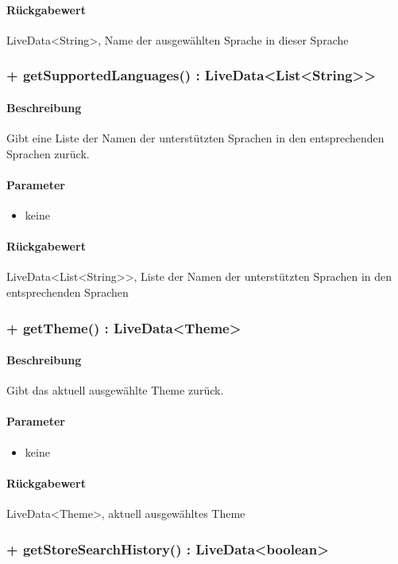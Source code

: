 \paragraph*{Rückgabewert}
LiveData<String>, Name der ausgewählten Sprache in dieser Sprache

\subsubsection{+ getSupportedLanguages() : LiveData<List<String>>}%
\paragraph*{Beschreibung}
Gibt eine Liste der Namen der unterstützten Sprachen in den entsprechenden Sprachen zurück.
\paragraph*{Parameter}
\begin{itemize}
    \item keine
\end{itemize}
\paragraph*{Rückgabewert}
LiveData<List<String>>, Liste der Namen der unterstützten Sprachen in den entsprechenden Sprachen

\subsubsection{+ getTheme() : LiveData<Theme>}%
\paragraph*{Beschreibung}
Gibt das aktuell ausgewählte Theme zurück.
\paragraph*{Parameter}
\begin{itemize}
    \item keine
\end{itemize}
\paragraph*{Rückgabewert}
LiveData<Theme>, aktuell ausgewähltes Theme

\subsubsection{+ getStoreSearchHistory() : LiveData<boolean>}%
